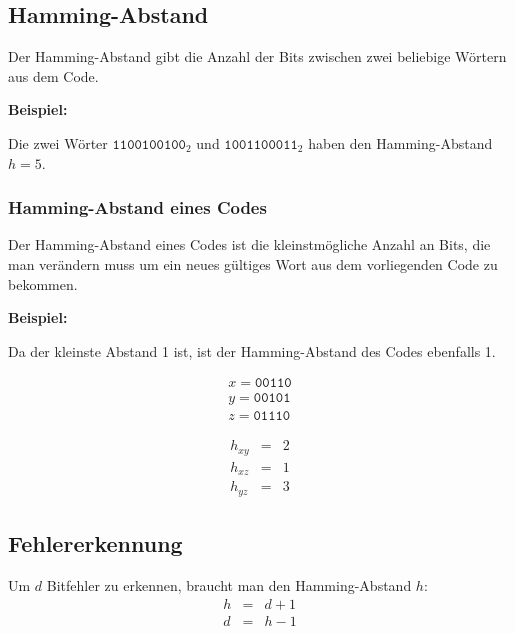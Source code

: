 \documentclass[a4paper, landscape]{article}
\newenvironment{example}{
    \par\vspace{\abovedisplayskip}\noindent\textbf{Beispiel:}\par
}{\par\vspace{\belowdisplayskip}}
\begin{document}
\begin{multicols}{3}
        \subsection{Hamming-Abstand}
        Der Hamming-Abstand gibt die Anzahl der Bits zwischen zwei beliebige Wörtern aus dem Code.
        \begin{example}
            Die zwei Wörter $\texttt{1100100100}_2$ und $\texttt{1001100011}_2$ haben den Hamming-Abstand $h = 5$.
        \end{example}
        
        \subsubsection*{Hamming-Abstand eines Codes}
        Der Hamming-Abstand eines Codes ist die kleinstmögliche Anzahl an Bits, die man verändern muss um ein neues gültiges Wort aus dem vorliegenden Code zu bekommen.
        \begin{example}
            Da der kleinste Abstand 1 ist, ist der Hamming-Abstand des Codes ebenfalls 1.
            \par\centering
            \begin{minipage}{.35\linewidth}
                \begin{align}
                    x = \texttt{00110}  \nonumber   \\
                    y = \texttt{00101}  \nonumber   \\
                    z = \texttt{01110}  \nonumber
                \end{align}
            \end{minipage}
            \begin{minipage}{.35\linewidth}
                \begin{eqnarray}
                    h_{xy} &=& 2    \nonumber   \\
                    h_{xz} &=& 1    \nonumber   \\
                    h_{yz} &=& 3    \nonumber
                \end{eqnarray}
            \end{minipage}
        \end{example}
        
        \subsection{Fehlererkennung}
        Um $d$ Bitfehler zu erkennen, braucht man den Hamming-Abstand $h$:
        \begin{eqnarray}
            h &=& d + 1 \nonumber \\
            d &=& h - 1 \nonumber
        \end{eqnarray}
        

\end{multicols}
\end{document}
